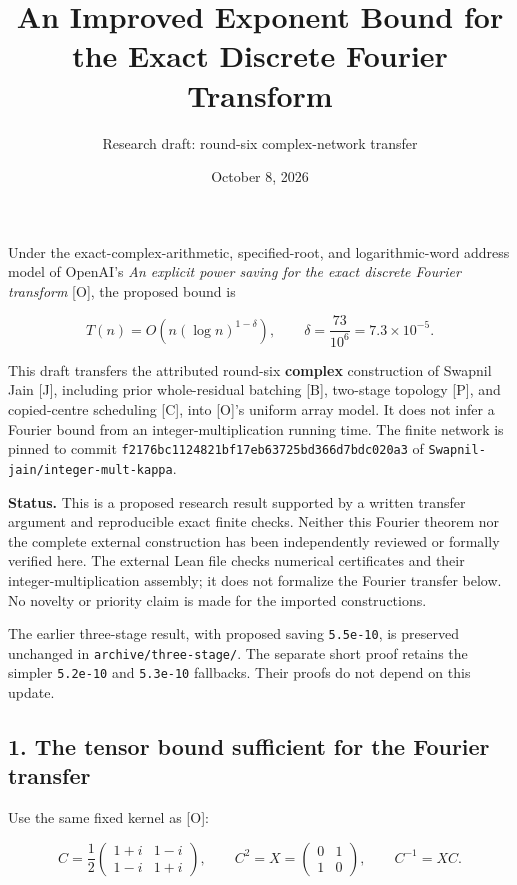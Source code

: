 \documentclass[
  11pt,
]{article}
\title{An Improved Exponent Bound for the Exact Discrete Fourier
Transform}
\subtitle{Research draft: round-six complex-network transfer}
\author{}
\date{October 8, 2026}
\begin{document}
\maketitle

Under the exact-complex-arithmetic, specified-root, and logarithmic-word
address model of OpenAI's \emph{An explicit power saving for the exact
discrete Fourier transform} {[}O{]}, the proposed bound is

\[
\boxed{T(n)=O\!\left(n(\log n)^{1-\delta}\right),\qquad
\delta=\frac{73}{10^6}=7.3\times10^{-5}.}
\]

This draft transfers the attributed round-six \textbf{complex}
construction of Swapnil Jain {[}J{]}, including prior whole-residual
batching {[}B{]}, two-stage topology {[}P{]}, and copied-centre
scheduling {[}C{]}, into {[}O{]}'s uniform array model. It does not
infer a Fourier bound from an integer-multiplication running time. The
finite network is pinned to commit
\texttt{f2176bc1124821bf17eb63725bd366d7bdc020a3} of
\texttt{Swapnil-jain/integer-mult-kappa}.

\textbf{Status.} This is a proposed research result supported by a
written transfer argument and reproducible exact finite checks. Neither
this Fourier theorem nor the complete external construction has been
independently reviewed or formally verified here. The external Lean file
checks numerical certificates and their integer-multiplication assembly;
it does not formalize the Fourier transfer below. No novelty or priority
claim is made for the imported constructions.

The earlier three-stage result, with proposed saving \texttt{5.5e-10},
is preserved unchanged in \texttt{archive/three-stage/}. The separate
short proof retains the simpler \texttt{5.2e-10} and \texttt{5.3e-10}
fallbacks. Their proofs do not depend on this update.

\subsection{1. The tensor bound sufficient for the Fourier
transfer}\label{the-tensor-bound-sufficient-for-the-fourier-transfer}

Use the same fixed kernel as {[}O{]}:

\[
 C=\frac12\begin{pmatrix}1+i&1-i\\1-i&1+i\end{pmatrix},
 \qquad C^2=X=\begin{pmatrix}0&1\\1&0\end{pmatrix},
 \qquad C^{-1}=XC.
\]
\end{document}
